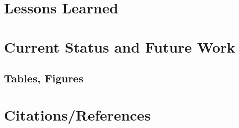 \documentclass{sig-alternate}
\begin{document}
\section{Lessons Learned}
\label{mistakes}


\section{Current Status and Future Work}
\label{current status}


\subsection{Tables, Figures}
\section{Citations/References}




\balance
\end{document}
